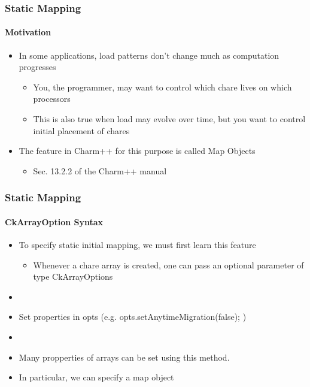 \begin{frame}[fragile]
  \frametitle{Static Mapping}
  \framesubtitle{Motivation}
  \begin{itemize}
    \item In some applications, load patterns don’t change much as computation progresses
    \begin{itemize}
      \item You, the programmer, may want to control which chare lives on which processors
      \item This is also true when  load may evolve over time, but you want to control initial placement of chares
    \end{itemize}
    \item The feature in Charm++ for this purpose is called Map Objects
    \begin{itemize}
      \item Sec. 13.2.2 of the Charm++ manual
    \end{itemize}
  \end{itemize}
\end{frame}

\begin{frame}[fragile]
  \frametitle{Static Mapping}
  \framesubtitle{CkArrayOption Syntax}
  \begin{itemize}
    \item To specify static initial mapping, we must first learn this feature
    \begin{itemize}
      \item Whenever a chare array is created, one can pass an optional parameter of type CkArrayOptions
    \end{itemize}
    \item {}
    \item Set properties in opts (e.g. opts.setAnytimeMigration(false); )
    \item {}
    \item Many propperties of arrays can be set using this method.
    \item In particular, we can specify a map object
  \end{itemize}
\end{frame}

